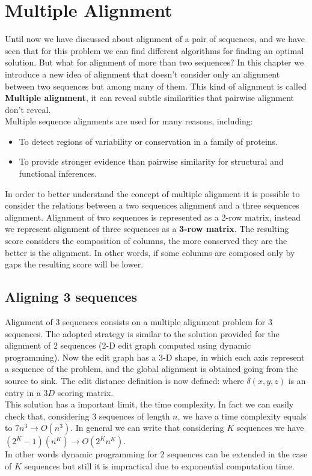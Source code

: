 \chapter{Multiple Alignment}
Until now we have discussed about alignment of a pair of sequences, and we have seen that for this problem we can find different algorithms for finding an optimal solution. But what for alignment of more than two sequences?
In this chapter we introduce a new idea of alignment that doesn't consider only an alignment between two sequences but among many of them. This kind of alignment is called \textbf{Multiple alignment}, it can reveal subtle similarities that pairwise alignment don't reveal.\\
Multiple sequence alignments are used for many reasons, including:
\begin{itemize}
	\item To detect regions of variability or conservation in a family of proteins.
	\item To provide stronger evidence than pairwise similarity for structural and functional inferences.
\end{itemize} 
In order to better understand the concept of multiple alignment it is possible to consider the relations between a two sequences alignment and a three sequences alignment. Alignment of two sequences is represented as a 2-row matrix, instead we represent alignment of three sequences as a \textbf{3-row matrix}.
The resulting score considers the composition of columns, the more conserved they are the better is the alignment. In other words, if some columns are composed only by gaps the resulting score will be lower.

\section{Aligning 3 sequences}
Alignment of $3$ sequences consists on a multiple alignment problem for $3$ sequences. The adopted strategy is similar to the solution provided for the alignment of $2$ sequences (2-D edit graph computed using dynamic programming). Now the edit graph has a 3-D shape, in which each axis represent a sequence of the problem, and the global alignment is obtained going from the source to sink.
The edit distance definition is now defined:
where $\delta(x,y,z)$ is an entry in a $3D$ scoring matrix.\\
This solution has a important limit, the time complexity. In fact we can easily check that, considering 3 sequences of length $n$, we have a time complexity equals to $7n^3 \rightarrow O(n^3)$. In general we can write that considering $K$ sequences we have $(2^K-1)(n^K) \rightarrow O(2^Kn^K)$.\\
In other words dynamic programming for 2 sequences can be extended in the case of $K$ sequences but still it is impractical due to exponential computation time.\\

